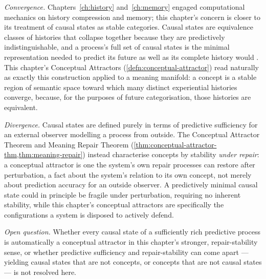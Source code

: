\documentclass[12pt,twoside,openright]{book}
\begin{document}
\emph{Convergence.} Chapters~\ref{ch:history} and~\ref{ch:memory}
engaged computational mechanics on history compression and
memory; this chapter's concern is closer to its treatment of
causal states as stable categories. Causal states are equivalence
classes of histories that collapse together because they are
predictively indistinguishable, and a process's full set of
causal states is the minimal representation needed to predict its
future as well as its complete history would
\parencite{crutchfield2012}. This chapter's Conceptual Attractors
(\cref{defn:conceptual-attractor}) read naturally as exactly this
construction applied to a meaning manifold: a concept is a stable
region of semantic space toward which many distinct experiential
histories converge, because, for the purposes of future
categorisation, those histories are equivalent.

\emph{Divergence.} Causal states are defined purely in terms of
predictive sufficiency for an external observer modelling a
process from outside. The Conceptual Attractor Theorem and
Meaning Repair Theorem
(\cref{thm:conceptual-attractor-thm,thm:meaning-repair}) instead
characterise concepts by stability \emph{under repair}: a
conceptual attractor is one the system's own repair processes can
restore after perturbation, a fact about the system's relation to
its own concept, not merely about prediction accuracy for an
outside observer. A predictively minimal causal state could in
principle be fragile under perturbation, requiring no inherent
stability, while this chapter's conceptual attractors are
specifically the configurations a system is disposed to actively
defend.

\emph{Open question.} Whether every causal state of a
sufficiently rich predictive process is automatically a
conceptual attractor in this chapter's stronger, repair-stability
sense, or whether predictive sufficiency and repair-stability can
come apart --- yielding causal states that are not concepts, or
concepts that are not causal states --- is not resolved here.
\end{document}
